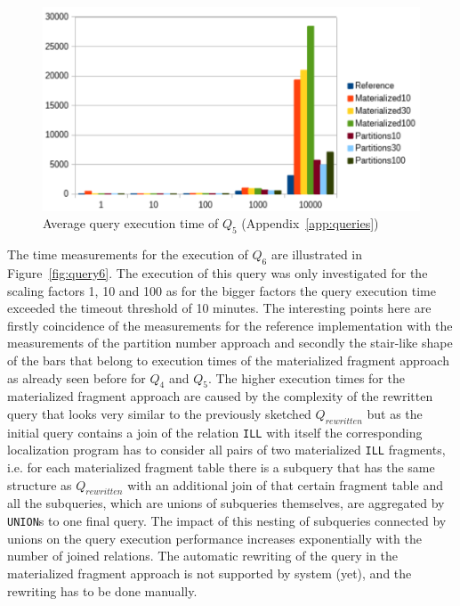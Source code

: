\begin{figure}[h]
    \centering
    \includegraphics[scale=0.8]{charts/Query5.pdf}
    \caption{Average query execution time of $Q_5$ (Appendix~\ref{app:queries})}
    \label{fig:query5}
\end{figure}



The time measurements for the execution of $Q_6$ are illustrated in Figure~\ref{fig:query6}. The execution of this query was only investigated for the scaling 
factors 1, 10 and 100 as for the bigger factors the query execution time exceeded the timeout threshold of 10 minutes. The interesting points here are firstly
coincidence of the measurements for the reference implementation with the measurements of the partition number approach and secondly the stair-like shape of
the bars that belong to execution times of the materialized fragment approach as already seen before for $Q_4$ and $Q_5$. The higher execution times for the
materialized fragment approach are caused by the complexity of the rewritten query that looks very similar to the previously sketched $Q_{rewritten}$ but as the
initial query contains a join of the relation \verb!ILL! with itself the corresponding localization program has to consider all pairs of two materialized
\verb!ILL! fragments, i.e. for each materialized fragment table there is a subquery that has the same structure as $Q_{rewritten}$ with an additional join of
that certain fragment table and all the subqueries, which are unions of subqueries themselves, are aggregated by \verb!UNION!s to one final query. The impact of
this nesting of subqueries connected by unions on the query execution performance increases exponentially with the number of joined relations. The automatic
rewriting of the query in the materialized fragment approach is not supported by system (yet), and the rewriting has to be done manually. 

